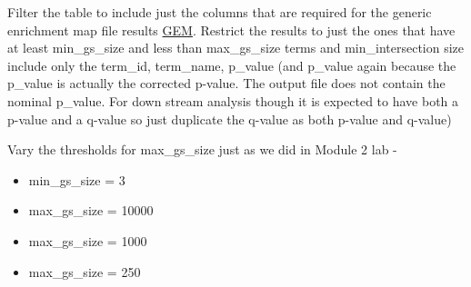 \documentclass[
]{book}
\begin{document}
Filter the table to include just the columns that are required for the generic enrichment map file results \href{https://enrichmentmap.readthedocs.io/en/latest/FileFormats.html\#generic-results-files}{GEM}. Restrict the results to just the ones that have at least min\_gs\_size and less than max\_gs\_size terms and min\_intersection size include only the term\_id, term\_name, p\_value (and p\_value again because the p\_value is actually the corrected p-value. The output file does not contain the nominal p\_value. For down stream analysis though it is expected to have both a p-value and a q-value so just duplicate the q-value as both p-value and q-value)

Vary the thresholds for max\_gs\_size just as we did in Module 2 lab -

\begin{itemize}
\item
  min\_gs\_size = 3
\item
  max\_gs\_size = 10000
\item
  max\_gs\_size = 1000
\item
  max\_gs\_size = 250
\end{itemize}
\end{document}
